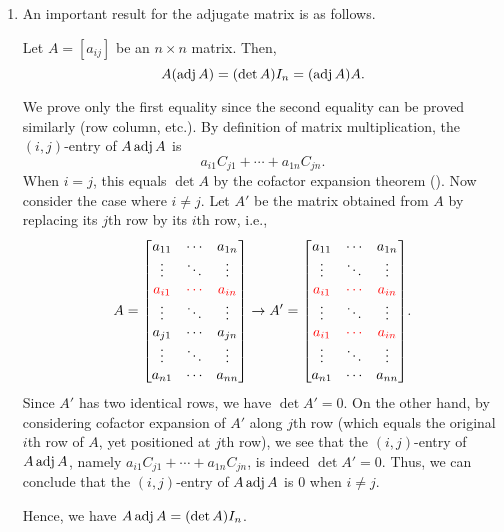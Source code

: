 \begin{enumerate}
\item An important result for the adjugate matrix is as follows.
\begin{theorem}
\label{thm:a-adj-det-a}
Let \(A=[a_{ij}]\) be an \(n\times n\) matrix. Then,
\[
A(\operatorname{adj} A)=(\det A)I_n=(\operatorname{adj} A)A.
\]
\end{theorem}
\begin{pf}
We prove only the first equality since the second equality can be proved
similarly (row  column, etc.). By definition of matrix
multiplication, the \((i,j)\)-entry of \(A\operatorname{adj} A\) is 
\[
a_{i1}C_{j1}+\dotsb+a_{1n}C_{jn}.
\]
When \(i=j\), this equals \(\det A\) by the cofactor expansion theorem
(). Now consider the case where \(i\ne j\). Let
\(A'\) be the matrix obtained from \(A\) by replacing its \(j\)th row by its
\(i\)th row, i.e.,
\[
A=\mqty[
a_{11}&\cdots&a_{1n}\\
\vdots&\ddots&\vdots\\
\rc{a_{i1}}&\rc{\cdots}&\rc{a_{in}}\\
\vdots&\ddots&\vdots\\
a_{j1}&\cdots&a_{jn}\\
\vdots&\ddots&\vdots\\
a_{n1}&\cdots&a_{nn}\\
]
\to
A'=\mqty[
a_{11}&\cdots&a_{1n}\\
\vdots&\ddots&\vdots\\
\rc{a_{i1}}&\rc{\cdots}&\rc{a_{in}}\\
\vdots&\ddots&\vdots\\
\rc{a_{i1}}&\rc{\cdots}&\rc{a_{in}}\\
\vdots&\ddots&\vdots\\
a_{n1}&\cdots&a_{nn}\\
].
\]
Since \(A'\) has two identical rows, we have \(\det A'=0\). On the other hand,
by considering cofactor expansion of \(A'\) along \(j\)th row (which equals the
original \(i\)th row of \(A\), yet positioned at \(j\)th row), we see that the
\((i,j)\)-entry of \(A\operatorname{adj} A\), namely \(a_{i1}C_{j1}+\dotsb+a_{1n}C_{jn}\), is
indeed \(\det A'=0\). Thus, we can conclude that the \((i,j)\)-entry of \(A\operatorname{adj}
A\) is \(0\) when \(i\ne j\).

Hence, we have \(A\operatorname{adj} A=(\det A)I_n\).
\end{pf}


\end{enumerate}
